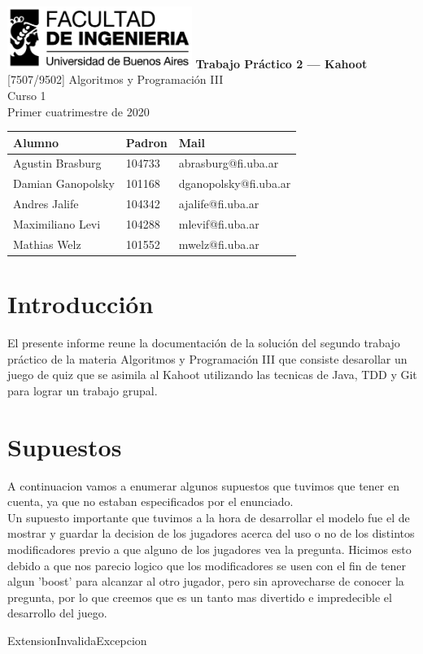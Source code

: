 \documentclass[titlepage,a4paper]{article}
\begin{document}
\begin{titlepage} %
	\hfill\includegraphics[width=6cm]{logofiuba.jpg}
    \centering
    \vfill
    \Huge \textbf{Trabajo Práctico 2 — Kahoot}
    \vskip2cm
    \Large [7507/9502] Algoritmos y Programación III\\
    Curso 1 \\ %
    Primer cuatrimestre de 2020
    \vfill
    \begin{tabular}{ | l | l | l |} %
      \hline
      Alumno & Padron & Mail \\ [0.5ex] 
      \hline\hline
     Agustin Brasburg & 104733 & abrasburg@fi.uba.ar\\ 
     \hline
     Damian Ganopolsky & 101168 & dganopolsky@fi.uba.ar\\
     \hline
     Andres Jalife & 104342 & ajalife@fi.uba.ar \\
     \hline
    Maximiliano Levi & 104288 & mlevif@fi.uba.ar \\
     \hline
     Mathias Welz & 101552 & mwelz@fi.uba.ar \\ [1ex] 
     \hline
  	\end{tabular}
    \vfill
    \vfill
\end{titlepage}

\tableofcontents %
\newpage

\section{Introducción}\label{sec:intro}
El presente informe reune la documentación de la solución del segundo trabajo práctico de la materia Algoritmos y Programación III que consiste desarollar un juego de quiz que se asimila al Kahoot utilizando las tecnicas de Java, TDD y Git para lograr un trabajo grupal.

\section{Supuestos}\label{sec:supuestos}
A continuacion vamos a enumerar algunos supuestos que tuvimos que tener en cuenta, ya que no estaban especificados por el enunciado.\\
Un supuesto importante que tuvimos a la hora de desarrollar el modelo fue el de mostrar y guardar la decision de los jugadores acerca del uso o no de los distintos modificadores previo a que alguno de los jugadores vea la pregunta. Hicimos esto debido a que nos parecio logico que los modificadores se usen con el fin de tener algun 'boost' para alcanzar al otro jugador, pero sin aprovecharse de conocer la pregunta, por lo que creemos que es un tanto mas divertido e impredecible el desarrollo del juego. 
\item[ExtensionInvalidaExcepcion]
\end{document}
